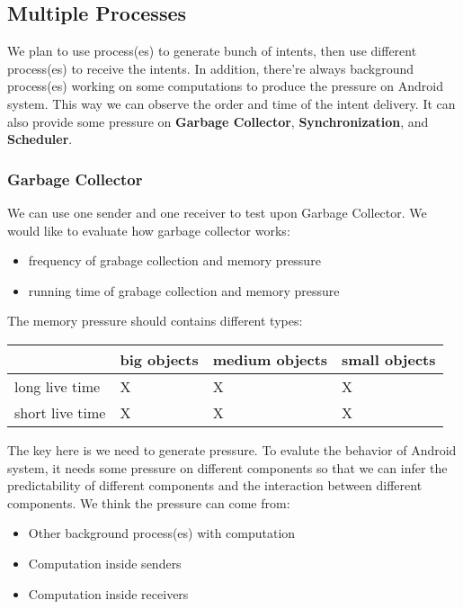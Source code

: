 \documentclass[11pt]{article}
\begin{document}
\subsection{Multiple Processes}
\label{sec-3-2}
We plan to use process(es) to generate bunch of intents, then use different
process(es) to receive the intents.
In addition, there're always background process(es) working on some computations
to produce the pressure on Android system.
This way we can observe the order and time of the intent delivery.
It can also provide some pressure on \textbf{Garbage Collector}, \textbf{Synchronization}, and \textbf{Scheduler}.

\subsubsection{Garbage Collector}
\label{sec-3-2-1}
We can use one sender and one receiver to test upon Garbage Collector.
We would like to evaluate how garbage collector works:
\begin{itemize}
\item frequency of grabage collection and memory pressure
\item running time of grabage collection and memory pressure
\end{itemize}

The memory pressure should contains different \label{Memory-Pressure-Types}types:
\begin{center}
\begin{tabular}{l|lll}
 & big objects & medium objects & small objects\\
\hline
long live time & X & X & X\\
short live time & X & X & X\\
\end{tabular}
\end{center}

The key here is we need to generate pressure.
To evalute the behavior of Android system, it needs some pressure on
different components so that we can infer the predictability of different
components and the interaction between different components.
We think the pressure can come from:

\begin{itemize}
\item Other background process(es) with computation
\item Computation inside senders
\item Computation inside receivers
\end{itemize}
\end{document}
